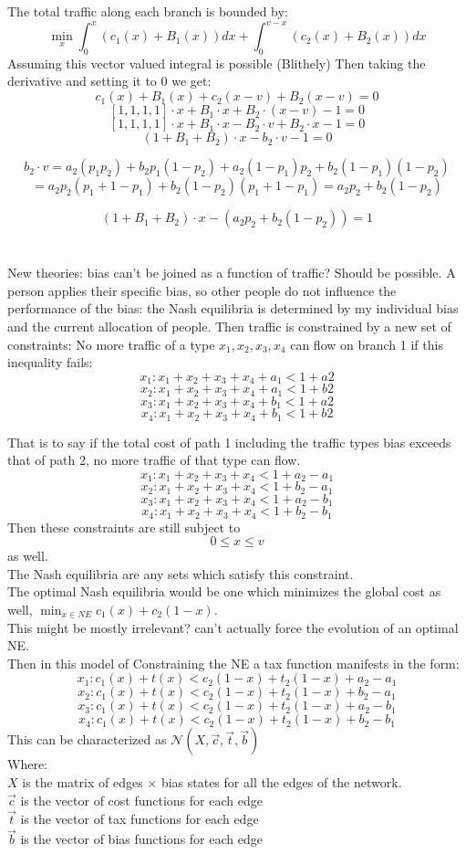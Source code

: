 \documentclass[12pt]{article}
\begin{document}
The total traffic along each branch is bounded by:
\[\min_x \int_0^x (c_1(x) +B_1(x))dx +  \int_0^{v-x}(c_2(x) +B_2(x))dx\]
Assuming this vector valued integral is possible (Blithely) Then taking the derivative and setting it to 0 we get:
\[ c_1(x) +B_1(x) + c_2(x-v) +B_2(x-v) = 0 \]
\[  [1,1,1,1] \cdot x + B_1 \cdot x  +B_2\cdot (x-v) -1 =0\]
\[  [1,1,1,1] \cdot x + B_1 \cdot x  -B_2\cdot v +B_2 \cdot x -1 =0\]
\[  (1+ B_1 +B_2) \cdot x - b_2\cdot v -1 =0\]

\[b_2 \cdot v = a_2(p_1p_2)+ b_2p_1(1-p_2)+a_2(1-p_1)p_2 + b_2(1-p_1)(1-p_2) \]\[= a_2p_2(p_1+1-p_1) +b_2(1-p_2)(p_1+1-p_1) = a_2p_2 +b_2(1-p_2)\]

\[  (1+ B_1 +B_2) \cdot x -( a_2p_2 +b_2(1-p_2)) = 1\]
\section{}
New theories: bias can't be joined as a function of traffic? Should be possible. A person applies their specific bias, so other people do not influence the performance of the bias: the Nash equilibria is determined by my individual bias  and the current allocation of people. Then traffic is constrained by a new set of constraints:
No more traffic of a type $x_1,x_2,x_3,x_4$ can flow on branch 1 if this inequality fails:
 \[x_1: x_1+x_2+x_3+x_4 + a_1  < 1+a2 \]
 \[x_2:x_1+x_2+x_3+x_4+ a_1  < 1+b2 \]
 \[x_3: x_1+x_2+x_3+x_4 + b_1  < 1+a2 \]
 \[x_4: x_1+x_2+x_3+x_4 + b_1  < 1+b2 \]
 
That is to say if the total cost of path 1 including the traffic types bias exceeds that of path 2, no more traffic of that type can flow.\\
 \[x_1: x_1+x_2+x_3+x_4   < 1+a_2 -a_1 \]
 \[x_2:x_1+x_2+x_3+x_4  < 1+b_2 -a_1 \]
 \[x_3: x_1+x_2+x_3+x_4  < 1+a_2-b_1 \]
 \[x_4: x_1+x_2+x_3+x_4  < 1+b_2 -b_1 \]
Then these constraints are still subject to \[0 \leq x \leq v\] as well.\\
 The Nash equilibria are any sets which satisfy this constraint.\\
 The optimal Nash equilibria would be one which minimizes the global cost as well, $\min_{x\in NE} c_1(x) + c_2(1-x)$.\\ This might be mostly irrelevant? can't actually force the evolution of an optimal NE.\\
 Then in this model of Constraining the NE a tax function manifests in the form:
 \[x_1: c_1(x) +t(x)   < c_2(1-x)+t_2(1-x)+a_2 -a_1 \]
 \[x_2:c_1(x)+t(x) < c_2(1-x)+t_2(1-x)+b_2 -a_1 \]
 \[x_3: c_1(x)+t(x)  < c_2(1-x)+t_2(1-x)+a_2-b_1 \]
 \[x_4: c_1(x)+t(x)  < c_2(1-x)+t_2(1-x)+b_2 -b_1 \]
 This can be characterized as $\mathcal N(X, \vec c, \vec t, \vec b)$\\
 Where:\\
  $X$ is the matrix of edges $\times$ bias states for all the edges of the network.\\
 $\vec c$ is the vector of cost functions for each edge\\
 $\vec t$ is the vector of tax functions for each edge\\
 $\vec b$ is the vector of bias functions for each edge\\
 
\end{document}
